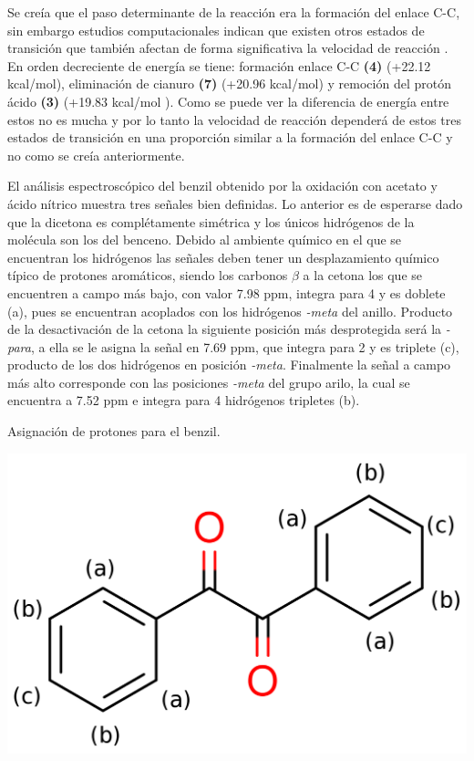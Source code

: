 \documentclass[fleqn,10pt]{SelfArx}
\begin{document}
Se creía que el paso determinante de la reacción era la formación del enlace C-C, sin embargo estudios computacionales indican que existen otros estados de transición que también afectan de forma significativa la velocidad de reacción \cite{yamabe2009}. En orden decreciente de energía se tiene: formación enlace C-C \textbf{(4)} (+22.12 kcal/mol), eliminación de cianuro \textbf{(7)} (+20.96 kcal/mol) y remoción del protón ácido \textbf{(3)} (+19.83 kcal/mol \cite{yamabe2009}). Como se puede ver la diferencia de energía entre estos no es mucha y por lo tanto la velocidad de reacción dependerá de estos tres estados de transición en una proporción similar a la formación del enlace C-C y no como se creía anteriormente.

El an\'alisis espectrosc\'opico del benzil obtenido por la oxidaci\'on con acetato y \'acido n\'itrico muestra tres se\~nales bien definidas. Lo anterior es de esperarse dado que la dicetona es compl\'etamente sim\'etrica y los \'unicos hidr\'ogenos de la mol\'ecula son los del benceno. Debido al ambiente qu\'imico en el que se encuentran los hidr\'ogenos las señales deben tener un desplazamiento qu\'imico t\'ipico de protones arom\'aticos, siendo los carbonos $\beta$ a la cetona los que se encuentren a campo m\'as bajo, con valor 7.98 ppm, integra para 4 y es doblete (a), pues se encuentran acoplados con los hidr\'ogenos \textit{-meta} del anillo. Producto de la desactivaci\'on de la cetona la siguiente posici\'on m\'as desprotegida ser\'a la \textit{-para}, a ella se le asigna la se\~nal en 7.69 ppm, que integra para 2 y es triplete (c), producto de los dos hidr\'ogenos en posici\'on \textit{-meta}. Finalmente la se\~nal a campo m\'as alto corresponde con las posiciones \textit{-meta} del grupo arilo, la cual se encuentra a 7.52 ppm e integra para 4 hidr\'ogenos tripletes (b).
\begin{scheme}[h]
	\centering
	\caption{Asignaci\'on de protones para el benzil.}
	\includegraphics[width=0.5\linewidth]{structures/picosbenzil.png}
\end{scheme}
\end{document}
